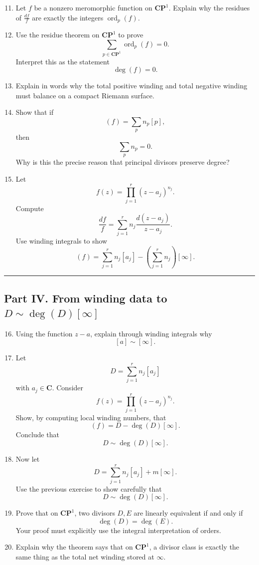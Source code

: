 \documentclass[11pt]{article}
\begin{document}
	\begin{enumerate}
		\setcounter{enumi}{10}
		
		\item Let \(f\) be a nonzero meromorphic function on \(\mathbf{CP}^1\). Explain why the residues of \(\frac{df}{f}\) are exactly the integers \(\operatorname{ord}_p(f)\).
		
		\item Use the residue theorem on \(\mathbf{CP}^1\) to prove
		\[
		\sum_{p\in \mathbf{CP}^1}\operatorname{ord}_p(f)=0.
		\]
		Interpret this as the statement
		\[
		\deg (f)=0.
		\]
		
		\item Explain in words why the total positive winding and total negative winding must balance on a compact Riemann surface.
		
		\item Show that if
		\[
		(f)=\sum_p n_p[p],
		\]
		then
		\[
		\sum_p n_p=0.
		\]
		Why is this the precise reason that principal divisors preserve degree?
		
		\item Let
		\[
		f(z)=\prod_{j=1}^r (z-a_j)^{n_j}.
		\]
		Compute
		\[
		\frac{df}{f}=\sum_{j=1}^r n_j\frac{d(z-a_j)}{z-a_j}.
		\]
		Use winding integrals to show
		\[
		(f)=\sum_{j=1}^r n_j[a_j]-\left(\sum_{j=1}^r n_j\right)[\infty].
		\]
	\end{enumerate}
	
	\bigskip
	\hrule
	\bigskip
	
	\subsection*{Part IV. From winding data to \texorpdfstring{$D\sim \deg(D)[\infty]$}{D~deg(D)[infinity]}}
	
	\begin{enumerate}
		\setcounter{enumi}{15}
		
		\item Using the function \(z-a\), explain through winding integrals why
		\[
		[a]\sim [\infty].
		\]
		
		\item Let
		\[
		D=\sum_{j=1}^r n_j[a_j]
		\]
		with \(a_j\in\mathbf{C}\). Consider
		\[
		f(z)=\prod_{j=1}^r (z-a_j)^{n_j}.
		\]
		Show, by computing local winding numbers, that
		\[
		(f)=D-\deg(D)[\infty].
		\]
		Conclude that
		\[
		D\sim \deg(D)[\infty].
		\]
		
		\item Now let
		\[
		D=\sum_{j=1}^r n_j[a_j]+m[\infty].
		\]
		Use the previous exercise to show carefully that
		\[
		D\sim \deg(D)[\infty].
		\]
		
		\item Prove that on \(\mathbf{CP}^1\), two divisors \(D,E\) are linearly equivalent if and only if
		\[
		\deg(D)=\deg(E).
		\]
		Your proof must explicitly use the integral interpretation of orders.
		
		\item Explain why the theorem says that on \(\mathbf{CP}^1\), a divisor class is exactly the same thing as the total net winding stored at \(\infty\).
	\end{enumerate}
	
\end{document}
